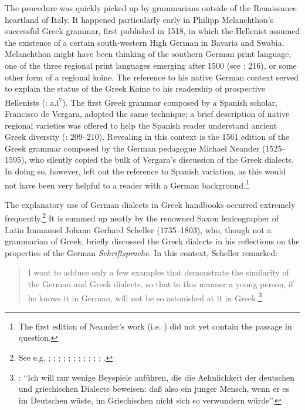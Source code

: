 The procedure was quickly picked up by grammarians outside of the Renaissance heartland of Italy. It happened particularly early in Philipp Melanchthon’s successful Greek grammar, first published in 1518, in which the  Hellenist assumed the existence of a certain south-western High German  in Bavaria and Swabia. Melanchthon might have been thinking of the southern German print language, one of the three regional print languages emerging after 1500 (see \citealt{Mattheier2003}: 216), or some other form of a regional koine. The reference to his native German context served to explain the status of the Greek Koine to his readership of prospective Hellenists (\citealt{Melanchthon1518}: a.i\textsc{\textsuperscript{v}}). The first Greek grammar composed by a Spanish scholar, Francisco de Vergara, adopted the same technique; a brief description of native regional varieties was offered to help the Spanish reader understand ancient Greek diversity (\citealt{Vergara1537}: 209–210). Revealing in this context is the 1561 edition of the Greek grammar composed by the German pedagogue Michael Neander (1525–1595), who silently copied the bulk of Vergara’s discussion of the Greek dialects. In doing so, however, \citet[340--343]{Neander1561} left out the reference to Spanish variation, as this would not have been very helpful to a reader with a German background.\footnote{The first edition of Neander’s work (i.e. \citealt{Neander1553}) did not yet contain the passage in question.}

The explanatory use of German dialects in Greek handbooks occurred extremely frequently.\footnote{See e.g. \citet[3--4]{Schmidt1604}; \citet[83]{Rhenius1626}; \citet[\textsc{b.4}\textsc{\textsuperscript{r}}]{Schorling1678}; \citet[\textsc{b.2}\textsc{\textsuperscript{v}}]{KirchmaierCrusius1684}; \citet[376]{Kober1701}; \citet[\textsc{c.2}\textsc{\textsuperscript{v}}]{Thryllitsch1709}; \citet[b.2\textsc{\textsuperscript{v}}\textsc{–}b.3\textsc{\textsuperscript{r}}]{Nibbe1725}; \citet[141]{Georgi1733}; \citet[13]{Schuster1737}; \citet[207--209]{Simonis1752}; \citet[191--192]{Peternader1776}; \citet[\textsc{xxvi}]{Harles1778}.} It is summed up neatly by the renowned Saxon lexicographer of Latin Immanuel Johann Gerhard Scheller (1735–1803), who, though not a grammarian of Greek, briefly discussed the Greek dialects in his reflections on the properties of the German \textit{Schriftsprache}. In this context, Scheller remarked:

\begin{quote}
I want to adduce only a few examples that demonstrate the similarity of the German and Greek dialects, so that in this manner a young person, if he knows it in German, will not be so astonished at it in Greek.\footnote{\citet[229]{Scheller1772}: “Ich will nur wenige Beyspiele anführen, die die Aehnlichkeit der deutschen und griechischen Dialecte beweisen: daß also ein junger Mensch, wenn er es im Deutschen wüste, im Griechischen nicht sich so verwundern würde”.}
\end{quote}

